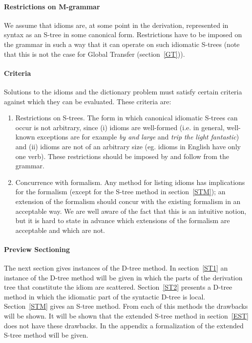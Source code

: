 \paragraph{Restrictions on M-grammar}
We assume that idioms are, at some point in the derivation, represented in
syntax as an S-tree in some canonical form. Restrictions have to be imposed on
the grammar in such a way that it can operate on such idiomatic S-trees (note
that this is not the case for Global Transfer (section~\ref{GT})). 

\paragraph{Criteria}
Solutions to the idioms and the dictionary problem must satisfy certain 
criteria against which they can be evaluated. These criteria are:
\begin{enumerate}
  \item Restrictions on S-trees. The form in which canonical idiomatic S-trees
can occur is not arbitrary, since (i) idioms are well-formed (i.e. in general, 
well-known exceptions are for example {\em by and large} and {\em trip the
light fantastic}) and (ii) idioms are not of an arbitrary size (eg. idioms in
English have only one verb). These restrictions should be imposed by and follow 
from the grammar. 
  \item Concurrence with formalism. Any method for listing idioms has 
implications for the formalism (except for the S-tree method in
section~\ref{STM}); an extension of the formalism should concur with the
existing formalism in an acceptable way. We are well aware of the fact that 
this is an intuitive notion, but it is hard to state in advance which 
extensions of the formalism are acceptable and which are not.
\end{enumerate}

\paragraph{Preview Sectioning}
The next section gives instances of the D-tree method.
In section~\ref{ST1} an instance of the D-tree method will be given in which 
the parts of the derivation tree that constitute the idiom are scattered. 
Section~\ref{ST2} presents a D-tree method in which the idiomatic 
part of the syntactic D-tree is local. Section~\ref{STM} gives an S-tree
method. From each of this methods the drawbacks will be shown. It will be shown
that the extended S-tree method in section~\ref{EST} does not have these
drawbacks. In the appendix a formalization of the extended S-tree method will 
be given.

